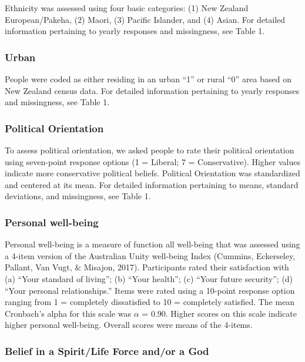 \documentclass[
  english,
  man,floatsintext]{apa6}
\begin{document}
Ethnicity was assessed using four basic categories: (1) New Zealand European/Pakeha, (2) Maori, (3) Pacific Islander, and (4) Asian. For detailed information pertaining to yearly responses and missingness, see Table 1.

\hypertarget{urban}{%
\subsubsection{Urban}\label{urban}}

People were coded as either residing in an urban \enquote{1} or rural \enquote{0} area based on New Zealand census data. For detailed information pertaining to yearly responses and missingness, see Table 1.

\hypertarget{political-orientation}{%
\subsubsection{Political Orientation}\label{political-orientation}}

To assess political orientation, we asked people to rate their political orientation using seven-point response options (1 = Liberal; 7 = Conservative). Higher values indicate more conservative political beliefs. Political Orientation was standardized and centered at its mean. For detailed information pertaining to means, standard deviations, and missingness, see Table 1.

\hypertarget{personal-well-being}{%
\subsubsection{Personal well-being}\label{personal-well-being}}

Personal well-being is a measure of function all well-being that was assessed using a 4-item version of the Australian Unity well-being Index (Cummins, Eckerseley, Pallant, Van Vugt, \& Misajon, 2017). Participants rated their satisfaction with (a) \enquote{Your standard of living}; (b) \enquote{Your health}; (c) \enquote{Your future security}; (d) \enquote{Your personal relationships.} Items were rated using a 10-point response option ranging from 1 = completely dissatisfied to 10 = completely satisfied. The mean Cronbach's alpha for this scale was \(\alpha\) = 0.90. Higher scores on this scale indicate higher personal well-being. Overall scores were means of the 4-items.

\hypertarget{belief-in-a-spiritlife-force-andor-a-god}{%
\subsubsection{Belief in a Spirit/Life Force and/or a God}\label{belief-in-a-spiritlife-force-andor-a-god}}
\end{document}
